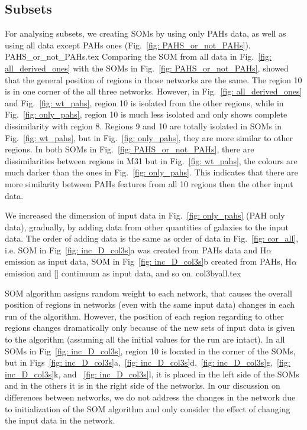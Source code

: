     \subsection{Subsets}
    \label{sec: subsets}
            For analysing subsets, we creating SOMs by using only PAHs data, as well as using all data except PAHs ones (Fig.~\ref{fig: PAHS_or_not_PAHs}).
             {PAHS_or_not_PAHs.tex}
            Comparing the SOM from all data in Fig.~\ref{fig: all_derived_ones} with the SOMs in Fig.~\ref{fig: PAHS_or_not_PAHs}, showed that the general position of regions in those networks are the same. 
            The region 10 is in one corner of the all three networks.
            However, in Fig.~\ref{fig: all_derived_ones} and Fig.~\ref{fig: wt_pahs}, region 10 is isolated from the other regions, while in Fig.~\ref{fig: only_pahs}, region 10 is much less isolated and only shows complete dissimilarity with region 8.
            Regions 9 and 10 are totally isolated in SOMs in Fig.~\ref{fig: wt_pahs}, but in Fig.~\ref{fig: only_pahs}, they are more similar to other regions.
            In both SOMs in Fig.~\ref{fig: PAHS_or_not_PAHs}, there are dissimilarities between regions in M31 but in Fig.~\ref{fig: wt_pahs}, the colours are much darker than the ones in Fig.~\ref{fig: only_pahs}.
            This indicates that there are more similarity between PAHs features from all 10 regions then the other input data.
            
            We increased the dimension of input data in Fig.~\ref{fig: only_pahs} (PAH only data), gradually, by adding data from other quantities of galaxies to the input data. 
            The order of adding data is the same as order of data in Fig.~\ref{fig: cor_all}, i.e. SOM in Fig~\ref{fig: inc_D_col3s}a was created from PAHs data and H$\alpha$ emission as input data, SOM in Fig~\ref{fig: inc_D_col3s}b created from PAHs, H$\alpha$ emission and [\sii] continuum as input data, and so on. 
            {col3byall.tex}
            
            SOM algorithm assigns random weight to each network, that causes the overall position of regions in networks (even with the same input data) changes in each run of the algorithm.
            However, the position of each region regarding to other regions changes dramatically only because of the new sets of input data is given to the algorithm (assuming all the initial values for the run are intact).
            In all SOMs in Fig~\ref{fig: inc_D_col3s}, region 10 is located in the corner of the SOMs, but in  Figs~\ref{fig: inc_D_col3s}a,~\ref{fig: inc_D_col3s}d,~\ref{fig: inc_D_col3s}g,~\ref{fig: inc_D_col3s}k, and ~\ref{fig: inc_D_col3s}l, it is placed in the left side of the SOMs and in the others it is in the right side of the networks.
            In our discussion on differences between networks, we do not address the changes in the network due to initialization of the SOM algorithm and only consider the effect of changing the input data in the network.
            
